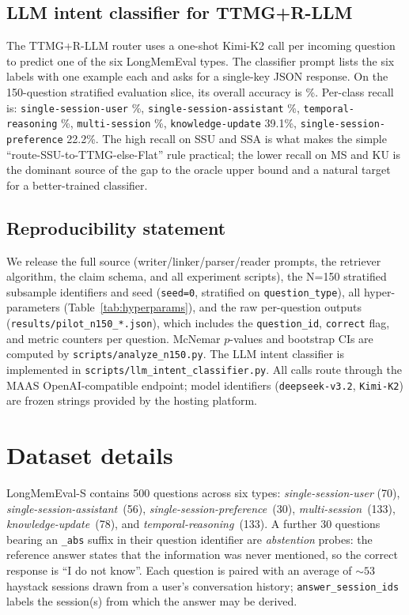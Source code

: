 \subsection{LLM intent classifier for TTMG+R-LLM}
\label{app:intent}
The TTMG+R-LLM router uses a one-shot Kimi-K2 call per incoming
question to predict one of the six LongMemEval types. The classifier
prompt lists the six labels with one example each and asks for a
single-key JSON response. On the 150-question stratified evaluation
slice, its overall accuracy is \IntentAccOverall\%. Per-class
recall is: \texttt{single-session-user} \IntentRecallSSU\%,
\texttt{single-session-assistant} \IntentRecallSSA\%,
\texttt{temporal-reasoning} \IntentRecallTR\%,
\texttt{multi-session} \IntentRecallMS\%, \texttt{knowledge-update}
39.1\%, \texttt{single-session-preference} 22.2\%. The high recall
on SSU and SSA is what makes the simple
``route-SSU-to-TTMG-else-Flat'' rule practical; the lower recall on
MS and KU is the dominant source of the gap to the oracle upper
bound and a natural target for a better-trained classifier.

\subsection{Reproducibility statement}
\label{app:reproduce}
We release the full source (writer/linker/parser/reader prompts,
the retriever algorithm, the claim schema, and all experiment
scripts), the N=150 stratified subsample identifiers and seed
(\texttt{seed=0}, stratified on \texttt{question\_type}), all
hyper-parameters (Table~\ref{tab:hyperparams}), and the raw
per-question outputs
(\texttt{results/pilot\_n150\_*.json}), which includes the
\texttt{question\_id}, \texttt{correct} flag, and metric counters
per question. McNemar $p$-values and bootstrap CIs are computed by
\texttt{scripts/analyze\_n150.py}. The LLM intent classifier is
implemented in \texttt{scripts/llm\_intent\_classifier.py}. All
calls route through the MAAS OpenAI-compatible endpoint; model
identifiers (\texttt{deepseek-v3.2}, \texttt{Kimi-K2}) are frozen
strings provided by the hosting platform.

\section{Dataset details}
\label{app:datasets}

LongMemEval-S contains 500 questions across six types:
\emph{single-session-user} (70), \emph{single-session-assistant}~(56),
\emph{single-session-preference}~(30), \emph{multi-session}~(133),
\emph{knowledge-update}~(78), and \emph{temporal-reasoning}~(133). A
further 30 questions bearing an \texttt{\_abs} suffix in their
question identifier are \emph{abstention} probes: the reference answer
states that the information was never mentioned, so the correct
response is ``I do not know''. Each question is paired with an
average of $\sim\!53$ haystack sessions drawn from a user's
conversation history; \texttt{answer\_session\_ids} labels the
session(s) from which the answer may be derived.

